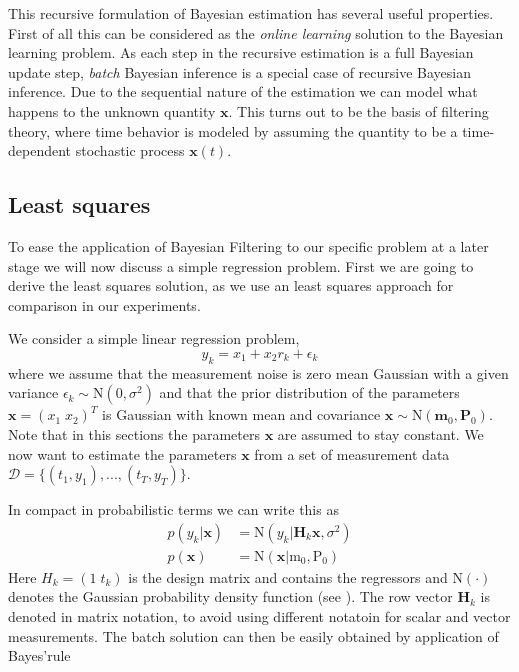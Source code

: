 This recursive formulation of Bayesian estimation has several useful
properties. First of all this can be considered as the
\textit{online learning} solution to the Bayesian learning problem.
As each step in the recursive estimation is a full Bayesian update step,
\textit{batch} Bayesian inference is a special case of recursive Bayesian
inference. Due to the sequential nature of the estimation we can model
what happens to the unknown quantity $\mathbf{x}$. This turns out
to be the basis of filtering theory, where time behavior is modeled
by assuming the quantity to be a time-dependent stochastic process
$\mathbf{x}(t)$.

\subsection{Least squares}
To ease the application of Bayesian Filtering to our specific problem
at a later stage we will now discuss a simple regression problem.
First we are going to derive the least squares solution, as
we use an least squares approach for comparison in our experiments.

We consider a simple linear regression problem,
\begin{equation}
  \label{regression_problem}
  y_k = x_1 + x_2 r_k + \epsilon_k
\end{equation}
where we assume that the measurement noise is zero mean Gaussian with
a given variance $\epsilon_k \sim \text{N}(0, \sigma^2)$ and that the
prior distribution of the
parameters $\mathbf{x} = (x_{1} \; x_{2})^T$ is
Gaussian with known mean and covariance
$\mathbf{x} \sim \text{N}(\mathbf{m}_0, \mathbf{P}_0)$. Note that
in this sections the parameters $\mathbf{x}$ are assumed to stay constant.
We now want to estimate
the parameters $\mathbf{x}$ from a set of measurement
data $\mathcal{D} = \{(t_1, y_1),...,(t_T, y_T)\}$.

In compact in probabilistic terms we can write this as
\begin{equation}
  \label{regression_model_1}
  \begin{aligned}
    p(y_k | \mathbf{x}) &= \text{N}(y_k | \mathbf{H}_k \mathbf{x}, \sigma^2) \\
    p(\mathbf{x}) &= \text{N}(\mathbf{x} | \text{m}_0, \text{P}_0)
  \end{aligned}
\end{equation}
Here $H_k = (1 \;t_k)$ is the design matrix and
contains the regressors and N$(\cdot)$ denotes
the Gaussian probability density
function (see ). The row vector $\mathbf{H}_k$ is denoted
in matrix notation, to avoid using different notatoin for scalar
and vector measurements.
The batch solution can then be easily obtained by application of Bayes'rule

